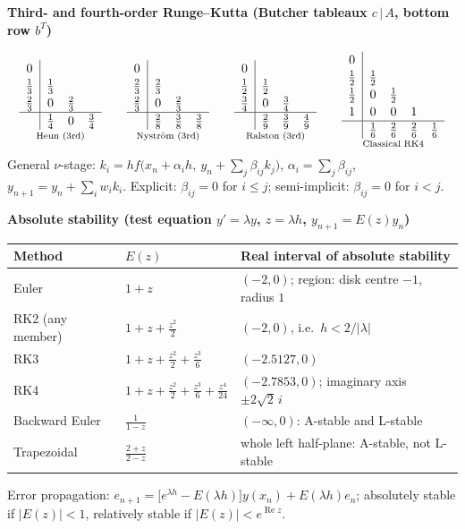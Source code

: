 \documentclass[10pt,a4paper]{article}
\newcommand{\head}[1]{\par\smallskip\noindent\textbf{\color{blue!50!black}#1}\par\nobreak}
\begin{document}
\head{Third- and fourth-order Runge--Kutta (Butcher tableaux \(c\,|\,A\), bottom row \(b^T\))}
\[
\renewcommand{\arraystretch}{1.15}
\underset{\text{Heun (3rd)}}{
\begin{array}{c|ccc}
0&&&\\ \frac13&\frac13&&\\ \frac23&0&\frac23&\\ \hline &\frac14&0&\frac34
\end{array}}
\qquad
\underset{\text{Nystr\"om (3rd)}}{
\begin{array}{c|ccc}
0&&&\\ \frac23&\frac23&&\\ \frac23&0&\frac23&\\ \hline &\frac28&\frac38&\frac38
\end{array}}
\qquad
\underset{\text{Ralston (3rd)}}{
\begin{array}{c|ccc}
0&&&\\ \frac12&\frac12&&\\ \frac34&0&\frac34&\\ \hline &\frac29&\frac39&\frac49
\end{array}}
\qquad
\underset{\text{Classical RK4}}{
\begin{array}{c|cccc}
0&&&&\\ \frac12&\frac12&&&\\ \frac12&0&\frac12&&\\ 1&0&0&1&\\ \hline &\frac16&\frac26&\frac26&\frac16
\end{array}}
\]
General \(\nu\)-stage: \(k_i=hf\bigl(x_n+\alpha_ih,\ y_n+\sum_j\beta_{ij}k_j\bigr)\),
\(\alpha_i=\sum_j\beta_{ij}\), \(y_{n+1}=y_n+\sum_iw_ik_i\).
Explicit: \(\beta_{ij}=0\) for \(i\le j\); semi-implicit: \(\beta_{ij}=0\) for \(i<j\).

\head{Absolute stability (test equation \(y'=\lambda y\), \(z=\lambda h\), \(y_{n+1}=E(z)y_n\))}
\begin{center}
\renewcommand{\arraystretch}{1.3}
\begin{tabular}{@{}lll@{}}
\toprule
Method & \(E(z)\) & Real interval of absolute stability\\
\midrule
Euler & \(1+z\) & \((-2,0)\); region: disk centre \(-1\), radius \(1\)\\
RK2 (any member) & \(1+z+\frac{z^2}2\) & \((-2,0)\), i.e.\ \(h<2/|\lambda|\)\\
RK3 & \(1+z+\frac{z^2}2+\frac{z^3}6\) & \((-2.5127,0)\)\\
RK4 & \(1+z+\frac{z^2}2+\frac{z^3}6+\frac{z^4}{24}\) & \((-2.7853,0)\); imaginary axis \(\pm2\sqrt2\,i\)\\
Backward Euler & \(\frac1{1-z}\) & \((-\infty,0)\): A-stable and L-stable\\
Trapezoidal & \(\frac{2+z}{2-z}\) & whole left half-plane: A-stable, not L-stable\\
\bottomrule
\end{tabular}
\end{center}
Error propagation:
\(e_{n+1}=\bigl[e^{\lambda h}-E(\lambda h)\bigr]y(x_n)+E(\lambda h)e_n\);
absolutely stable if \(|E(z)|<1\), relatively stable if \(|E(z)|<e^{\operatorname{Re}z}\).
\end{document}
